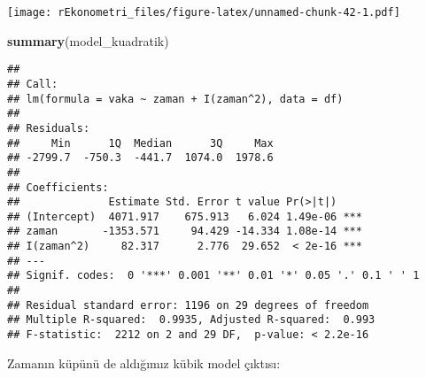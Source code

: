 \documentclass[
]{book}
\newenvironment{Shaded}{\begin{snugshade}}{\end{snugshade}}
\newcommand{\DataTypeTok}[1]{\textcolor[rgb]{0.13,0.29,0.53}{#1}}
\newcommand{\DecValTok}[1]{\textcolor[rgb]{0.00,0.00,0.81}{#1}}
\newcommand{\KeywordTok}[1]{\textcolor[rgb]{0.13,0.29,0.53}{\textbf{#1}}}
\newcommand{\NormalTok}[1]{#1}
\newcommand{\OperatorTok}[1]{\textcolor[rgb]{0.81,0.36,0.00}{\textbf{#1}}}
\newcommand{\StringTok}[1]{\textcolor[rgb]{0.31,0.60,0.02}{#1}}
\begin{document}
\begin{Shaded}
\end{Shaded}

\texttt{[image: rEkonometri\_files/figure-latex/unnamed-chunk-42-1.pdf]}

\begin{Shaded}
\begin{Highlighting}[]
\KeywordTok{summary}\NormalTok{(model_kuadratik)}
\end{Highlighting}
\end{Shaded}

\begin{verbatim}
## 
## Call:
## lm(formula = vaka ~ zaman + I(zaman^2), data = df)
## 
## Residuals:
##     Min      1Q  Median      3Q     Max 
## -2799.7  -750.3  -441.7  1074.0  1978.6 
## 
## Coefficients:
##              Estimate Std. Error t value Pr(>|t|)    
## (Intercept)  4071.917    675.913   6.024 1.49e-06 ***
## zaman       -1353.571     94.429 -14.334 1.08e-14 ***
## I(zaman^2)     82.317      2.776  29.652  < 2e-16 ***
## ---
## Signif. codes:  0 '***' 0.001 '**' 0.01 '*' 0.05 '.' 0.1 ' ' 1
## 
## Residual standard error: 1196 on 29 degrees of freedom
## Multiple R-squared:  0.9935, Adjusted R-squared:  0.993 
## F-statistic:  2212 on 2 and 29 DF,  p-value: < 2.2e-16
\end{verbatim}

Zamanın küpünü de aldığımız kübik model çıktısı:
\end{document}
